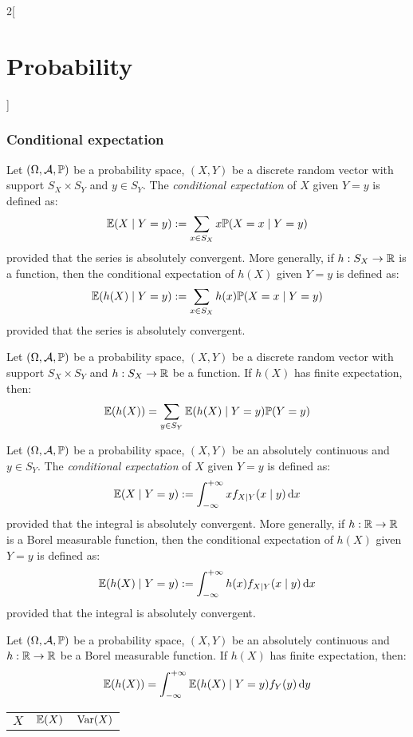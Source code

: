 \documentclass[../../../main.tex]{subfiles}
\begin{document}
\begin{multicols}{2}[\section{Probability}]
  \subsubsection{Conditional expectation}
  \begin{definition}
    Let $(\Omega,\mathcal{A},\mathbb{P})$ be a probability space, $(X,Y)$ be a discrete random vector with support $S_X\times S_Y$ and $y\in S_Y$. The \emph{conditional expectation} of $X$ given $Y=y$ is defined as: $$\mathbb{E}(X\mid Y=y):=\sum_{x\in S_X}x\mathbb{P}(X=x\mid Y=y)$$ provided that the series is absolutely convergent. More generally, if $h:S_X\rightarrow\mathbb{R}$ is a function, then the conditional expectation of $h(X)$ given $Y=y$ is defined as: $$\mathbb{E}(h(X)\mid Y=y):=\sum_{x\in S_X}h(x)\mathbb{P}(X=x\mid Y=y)$$ provided that the series is absolutely convergent.
  \end{definition}
  \begin{proposition}
    Let $(\Omega,\mathcal{A},\mathbb{P})$ be a probability space, $(X,Y)$ be a discrete random vector with support $S_X\times S_Y$ and $h:S_X\rightarrow\mathbb{R}$ be a function. If $h(X)$ has finite expectation, then: $$\mathbb{E}(h(X))=\sum_{y\in S_Y}\mathbb{E}(h(X)\mid Y=y)\mathbb{P}(Y=y)$$
  \end{proposition}
  \begin{definition}
    Let $(\Omega,\mathcal{A},\mathbb{P})$ be a probability space, $(X,Y)$ be an absolutely continuous and $y\in S_Y$. The \emph{conditional expectation} of $X$ given $Y=y$ is defined as: $$\mathbb{E}(X\mid Y=y):=\int_{-\infty}^{+\infty}xf_{X\mid Y}(x\mid y)\dd{x}$$ provided that the integral is absolutely convergent. More generally, if $h:\mathbb{R}\rightarrow\mathbb{R}$ is a Borel measurable function, then the conditional expectation of $h(X)$ given $Y=y$ is defined as: $$\mathbb{E}(h(X)\mid Y=y):=\int_{-\infty}^{+\infty}h(x)f_{X\mid Y}(x\mid y)\dd{x}$$ provided that the integral is absolutely convergent.
  \end{definition}
  \begin{proposition}
    Let $(\Omega,\mathcal{A},\mathbb{P})$ be a probability space, $(X,Y)$ be an absolutely continuous and $h:\mathbb{R}\rightarrow\mathbb{R}$ be a Borel measurable function. If $h(X)$ has finite expectation, then: $$\mathbb{E}(h(X))=\int_{-\infty}^{+\infty}\mathbb{E}(h(X)\mid Y=y)f_Y(y)\dd{y}$$
  \end{proposition}
  \begin{center}
    \def\arraystretch{1.25}
    \begin{tabular}{|c|c|c|}
      \hline
      $X$                          & $\displaystyle \mathbb{E}(X)$       & $\displaystyle \operatorname{Var}(X)$                     \\

\end{tabular}
\end{center}
\end{multicols}
\end{document}
